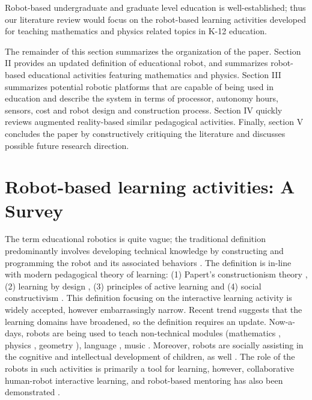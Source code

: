 \documentclass[conference]{IEEEtran}
\begin{document}
Robot-based undergraduate and graduate level education is well-established; thus our literature review would focus on 
the robot-based learning activities developed for teaching mathematics and physics related topics in K-12 education.

The remainder of this section summarizes the organization of the paper. Section II provides an updated definition of 
educational robot, and summarizes robot-based educational activities featuring mathematics and physics. Section III 
summarizes potential robotic platforms that are capable of being used in education and describe the system in terms 
of processor, autonomy hours, sensors, cost and robot design and construction process. Section IV quickly reviews 
augmented reality-based similar pedagogical activities. Finally, section V concludes the paper by constructively 
critiquing the literature and discusses possible future research direction.
\section{Robot-based learning activities: A Survey}
The term educational robotics is quite vague; the traditional definition predominantly involves developing technical 
knowledge by constructing and programming the robot and its associated behaviors \cite{hsiu2003designing, 
barker2007robotics, balch2008designing}. The definition is in-line with modern pedagogical theory of learning: (1) 
Papert's constructionism theory \cite{papert1980mindstorms, ackermann2001piaget}, (2) learning by design 
\cite{goldman2004using}, (3) principles of active learning \cite{harmin2006inspiring} and (4) social constructivism 
\cite{vygotsky1980mind}. This definition focusing on the interactive learning activity is widely accepted, however 
embarrassingly narrow. Recent trend suggests that the learning domains have broadened, so the definition requires an 
update. Now-a-days, robots are being used to teach non-technical modules (mathematics \cite{highfield2008early, 
robotmath}, physics \cite{mitnik2008autonomous}, geometry \cite{mitnik2008autonomous, robotmath}), language 
\cite{kanda2004interactive, han2009r}, music \cite{han2009physical}. Moreover, robots are socially assisting in the 
cognitive and intellectual development of children, as well \cite{mataric1999socially}. The role of the robots in such 
activities is primarily a tool for learning, however, collaborative human-robot interactive learning, and robot-based 
mentoring has also been demonstrated \cite{mitnik2008autonomous}.
\end{document}
